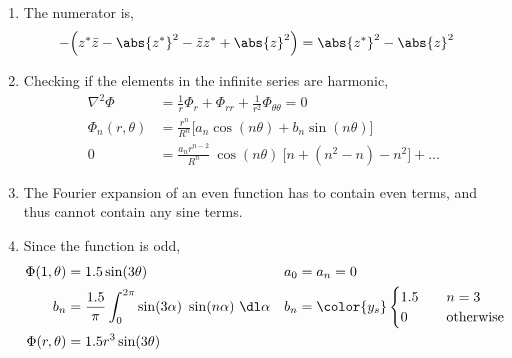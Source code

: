 \begin{enumerate}
    \item The numerator is,
          \begin{align}
              -\Big(z^*\bar{z} - \abs{z^*}^2 - \bar{z}z^* + \abs{z}^2\Big) & =
              \abs{z^*}^2 - \abs{z}^2
          \end{align}

    \item Checking if the elements in the infinite series are harmonic,
          \begin{align}
              \nabla^2 \Phi     & = \frac{1}{r} \Phi_r + \Phi_{rr}
              + \frac{1}{r^2} \Phi_{\theta\theta} = 0                      \\
              \Phi_n(r, \theta) & = \frac{r^n}{R^n}\Big[a_n\cos(n\theta) +
              b_n\sin(n\theta)\Big]                                        \\
              0                 & = \frac{a_n r^{n-2}}{R^n}\ \cos(n\theta)
              \ \Bigg[ n + (n^2 - n) - n^2 \Bigg] + \dots
          \end{align}

    \item The Fourier expansion of an even function has to contain even terms, and
          thus cannot contain any sine terms.

    \item Since the function is odd,
          \begin{align}
              \Phi(1, \theta) & = 1.5\sin(3\theta)                &
              a_0             & = a_n = 0                                  \\
              b_n             & = \frac{1.5}{\pi} \int_{0}^{2\pi}
              \sin(3\alpha)\ \sin(n\alpha)\ \dl \alpha
                              &
              b_n             & = \color{y_s} \begin{cases}
                                                  1.5 & \quad n = 3            \\
                                                  0   & \quad \text{otherwise}
                                              \end{cases} \\
              \Phi(r, \theta) & = 1.5r^3 \sin(3\theta)
          \end{align}


\end{enumerate}
